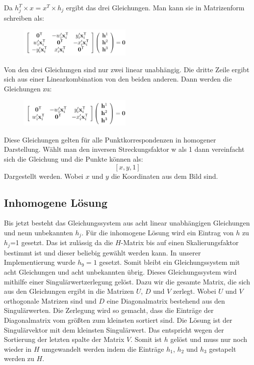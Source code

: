 Da $h_j^T\times x=x^T\times h_j$ ergibt das drei Gleichungen.  Man kann sie in Matrizenform schreiben als:
 
\begin{figure}[ht]
    \centering
    \includegraphics[width=0.49\textwidth]{FiguresIS/41.jpg}
    \caption{\cite{Richard2000}}
\end{figure}


Von den drei Gleichungen sind nur zwei linear unabhängig. Die dritte Zeile ergibt sich aus einer Linearkombination von den beiden anderen. Dann werden die Gleichungen zu:

\begin{figure}[ht]
    \centering
    \includegraphics[width=0.49\textwidth]{FiguresIS/43.jpg}
    \caption{\cite{Richard2000}}
\end{figure}

Diese Gleichungen gelten für alle Punktkorrespondenzen in homogener Darstellung. Wählt man den inversen Streckungsfaktor w als 1 dann vereinfacht sich die Gleichung und die Punkte können als:
			$$[x, y, 1]$$
Dargestellt werden. Wobei $x$ und $y$ die Koordinaten aus dem Bild sind.

\subsection{Inhomogene Lösung}
Bis jetzt besteht das Gleichungssystem aus acht linear unabhängigen Gleichungen und neun unbekannten $h_j$. Für die inhomogene Lösung wird ein Eintrag von $h$ zu $h_j$=1 gesetzt. Das ist zulässig da die $H$-Matrix bis auf einen Skalierungsfaktor bestimmt ist und dieser beliebig gewählt werden kann. In unserer Implementierung wurde $h_9=1$ gesetzt. Somit bleibt ein Gleichungssystem mit acht Gleichungen und acht unbekannten übrig.
Dieses Gleichungssystem wird mithilfe einer Singulärwertzerlegung gelöst. Dazu wir die gesamte Matrix, die sich aus den Gleichungen ergibt in die Matrizen $U$, $D$ und $V$ zerlegt. Wobei $U$ und $V$ orthogonale Matrizen sind und $D$ eine Diagonalmatrix bestehend aus den Singulärwerten. Die Zerlegung wird so gemacht, dass die Einträge der Diagonalmatrix vom größten zum kleinsten sortiert sind. Die Lösung ist der Singulärvektor mit dem kleinsten Singulärwert. Das entspricht wegen der Sortierung der letzten spalte der Matrix $V$. Somit ist $h$ gelöst und muss nur noch wieder in $H$ umgewandelt werden indem die Einträge $h_1$, $h_2$ und $h_3$ gestapelt werden zu $H$.

